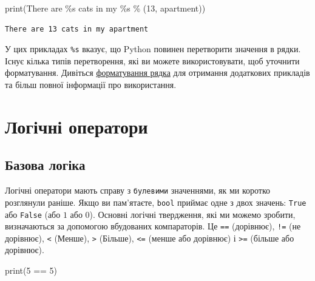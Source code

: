 \documentclass[
  letterpaper,
]{report}
\newenvironment{Shaded}{\begin{snugshade}}{\end{snugshade}}
\newcommand{\BuiltInTok}[1]{\textcolor[rgb]{0.00,0.23,0.31}{#1}}
\newcommand{\DecValTok}[1]{\textcolor[rgb]{0.68,0.00,0.00}{#1}}
\newcommand{\NormalTok}[1]{\textcolor[rgb]{0.00,0.23,0.31}{#1}}
\newcommand{\OperatorTok}[1]{\textcolor[rgb]{0.37,0.37,0.37}{#1}}
\newcommand{\SpecialCharTok}[1]{\textcolor[rgb]{0.37,0.37,0.37}{#1}}
\newcommand{\StringTok}[1]{\textcolor[rgb]{0.13,0.47,0.30}{#1}}
\begin{document}
\begin{Shaded}
\begin{Highlighting}[]
\BuiltInTok{print}\NormalTok{(}\StringTok{\textquotesingle{}There are }\SpecialCharTok{\%s}\StringTok{ cats in my }\SpecialCharTok{\%s}\StringTok{\textquotesingle{}} \OperatorTok{\%}\NormalTok{ (}\DecValTok{13}\NormalTok{, }\StringTok{\textquotesingle{}apartment\textquotesingle{}}\NormalTok{))}
\end{Highlighting}
\end{Shaded}

\begin{verbatim}
There are 13 cats in my apartment
\end{verbatim}

У цих прикладах \texttt{\%s} вказує, що Python повинен перетворити
значення в рядки. Існує кілька типів перетворення, які ви можете
використовувати, щоб уточнити форматування. Дивіться
\href{https://docs.python.org/3/library/stdtypes.html\#string-formatting}{форматування
рядка} для отримання додаткових прикладів та більш повної інформації про
використання.

\hypertarget{ux43bux43eux433ux456ux447ux43dux456-ux43eux43fux435ux440ux430ux442ux43eux440ux438}{%
\section{Логічні
оператори}\label{ux43bux43eux433ux456ux447ux43dux456-ux43eux43fux435ux440ux430ux442ux43eux440ux438}}

\hypertarget{ux431ux430ux437ux43eux432ux430-ux43bux43eux433ux456ux43aux430}{%
\subsection{Базова
логіка}\label{ux431ux430ux437ux43eux432ux430-ux43bux43eux433ux456ux43aux430}}

Логічні оператори мають справу з \texttt{булевими} значеннями, як ми
коротко розглянули раніше. Якщо ви пам'ятаєте, \texttt{bool} приймає
одне з двох значень: \texttt{True} або \texttt{False} (або \(1\) або
\(0\)). Основні логічні твердження, які ми можемо зробити, визначаються
за допомогою вбудованих компараторів. Це \texttt{==} (дорівнює),
\texttt{!=} (не дорівнює), \texttt{\textless{}} (Менше),
\texttt{\textgreater{}} (Більше), \texttt{\textless{}=} (менше або
дорівнює) і \texttt{\textgreater{}=} (більше або дорівнює).

\begin{Shaded}
\begin{Highlighting}[]
\BuiltInTok{print}\NormalTok{(}\DecValTok{5} \OperatorTok{==} \DecValTok{5}\NormalTok{)}
\end{Highlighting}
\end{Shaded}
\end{document}
